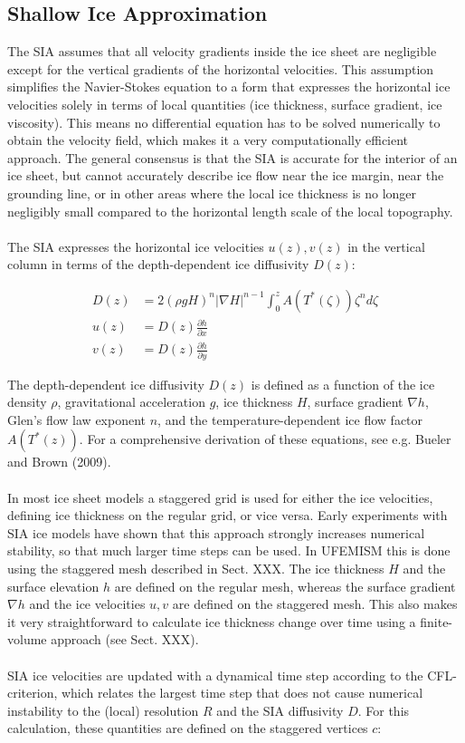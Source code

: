 \documentclass{article}
\begin{document}
\subsection{Shallow Ice Approximation}

The SIA assumes that all velocity gradients inside the ice sheet are negligible except for the vertical gradients of the horizontal velocities. This assumption simplifies the Navier-Stokes equation to a form that expresses the horizontal ice velocities solely in terms of local quantities (ice thickness, surface gradient, ice viscosity). This means no differential equation has to be solved numerically to obtain the velocity field, which makes it a very computationally efficient approach. The general consensus is that the SIA is accurate for the interior of an ice sheet, but cannot accurately describe ice flow near the ice margin, near the grounding line, or in other areas where the local ice thickness is no longer negligibly small compared to the horizontal length scale of the local topography.\\
\\
The SIA expresses the horizontal ice velocities $u(z),v(z)$ in the vertical column in terms of the depth-dependent ice diffusivity $D(z)$:

\begin{align} \label{eq:SIA}
D(z) &= 2 {(\rho g H)}^n {\left| \nabla H \right| }^{n-1} \int_0^z A\left( T^{\ast}(\zeta)\right) \zeta^n d\zeta \\
u(z) &= D(z) \frac{\partial h}{\partial x} \\
v(z) &= D(z) \frac{\partial h}{\partial y}
\end{align}

The depth-dependent ice diffusivity $D(z)$ is defined as a function of the ice density $\rho$, gravitational acceleration $g$, ice thickness $H$, surface gradient $\nabla h$, Glen's flow law exponent $n$, and the temperature-dependent ice flow factor $A\left( T^{\ast}(z) \right)$. For a comprehensive derivation of these equations, see e.g. Bueler and Brown (2009).\\
\\
In most ice sheet models a staggered grid is used for either the ice velocities, defining ice thickness on the regular grid, or vice versa. Early experiments with SIA ice models have shown that this approach strongly increases numerical stability, so that much larger time steps can be used. In UFEMISM this is done using the staggered mesh described in Sect. XXX. The ice thickness $H$ and the surface elevation $h$ are defined on the regular mesh, whereas the surface gradient $\nabla h$ and the ice velocities $u,v$ are defined on the staggered mesh. This also makes it very straightforward to calculate ice thickness change over time using a finite-volume approach (see Sect. XXX).\\
\\
SIA ice velocities are updated with a dynamical time step according to the CFL-criterion, which relates the largest time step that does not cause numerical instability to the (local) resolution $R$ and the SIA diffusivity $D$. For this calculation, these quantities are defined on the staggered vertices $c$:
\end{document}
